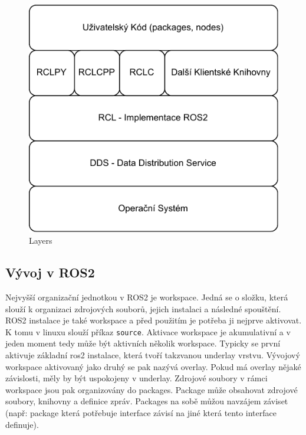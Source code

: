 \begin{figure}[h!]
	\centering
	\includegraphics[scale=0.75]{obrazky-figures/ros_layers.pdf}
	\caption{Layers}
	\label{}
\end{figure}

\subsection{Vývoj v ROS2} %
Nejvyšší organizační jednotkou v ROS2 je workspace. Jedná se o složku, která slouží k organizaci zdrojových souborů, jejich instalaci a následné spouštění. ROS2 instalace je také workspace a před použitím je potřeba ji nejprve aktivovat. K tomu v linuxu slouží příkaz \verb|source|. Aktivace workspace je akumulativní a v jeden moment tedy může být aktivních několik workspace. Typicky se první aktivuje základní ros2 instalace, která tvoří takzvanou underlay vrstvu. Vývojový workspace aktivovaný jako druhý se pak nazývá overlay. Pokud má overlay nějaké závislosti, měly by být uspokojeny v underlay.
Zdrojové soubory v rámci workspace jsou pak organizovány do packages. Package může obsahovat zdrojové soubory, knihovny a definice zpráv. Packages na sobě můžou navzájem záviset (např: package která potřebuje interface závisí na jiné která tento interface definuje).

